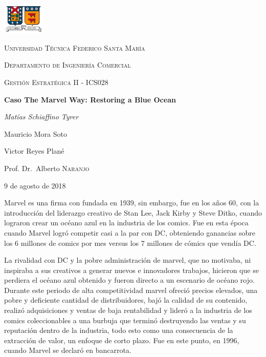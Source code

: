 \documentclass[letterpaper,12pt,oneside]{article}
\begin{document}
{\setlength{\parskip}{5pt} %
\begin{titlepage}
	\centering
	\includegraphics[width=0.15\textwidth]{logo_usm1}\par\vspace{1cm}
	{\scshape\LARGE Universidad Técnica Federico Santa María \par}
	{\scshape\LARGE Departamento de Ingeniería Comercial \par}
	\vspace{0.5cm}
	{\scshape\Large Gestión Estratégica II - ICS028\par}
	\vspace{0.75cm}
	{\huge\bfseries Caso The Marvel Way: Restoring a Blue Ocean\par}
	\vspace{1cm}
	{\Large\itshape Matías Schiaffino Tyrer\par
	Mauricio Mora Soto\par
	Victor Reyes Plané\par}
	\vfill
	Prof. Dr.~Alberto \textsc{Naranjo}
	\vfill
	{\large 9 de agosto de 2018\par}
\end{titlepage}}

Marvel es una firma con fundada en 1939, sin embargo, fue en los años 60, con la introducción del liderazgo creativo de Stan Lee, Jack Kirby y Steve Ditko, cuando lograron crear un océano azul en la industria de los comics. Fue en esta época cuando Marvel logró competir casi a la par con DC, obteniendo ganancias sobre los 6 millones de comics por mes versus los 7 millones de cómics que vendía DC.

La rivalidad con DC y la pobre administración de marvel, que no motivaba, ni inspiraba a sus creativos a generar nuevos e innovadores trabajos, hicieron que se perdiera el océano azul obtenido y fueron directo a un escenario de océano rojo. Durante este periodo de alta competitividad marvel ofreció precios elevados, una pobre y deficiente cantidad de distribuidores, bajó la calidad de su contenido, realizó adquisiciones y ventas de baja rentabilidad y lideró a la industria de los comics coleccionables a una burbuja que terminó destruyendo las ventas y su reputación dentro de la industria, todo esto como una consecuencia de la extracción de valor, un enfoque de corto plazo. Fue en este punto, en 1996, cuando Marvel se declaró en bancarrota.
\end{document}
